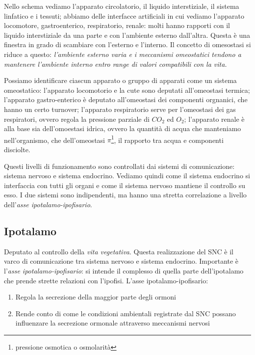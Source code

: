 \documentclass[a4paper,12pt]{article}
\begin{document}
Nello schema vediamo l'apparato circolatorio, il liquido interstiziale, il sistema linfatico e i tessuti; abbiamo delle interfacce artificiali in cui vediamo l'apparato locomotore, gastroenterico, respiratorio, renale: molti hanno rapporti con il liquido interstiziale da una parte e con l'ambiente esterno dall'altra. Questa è una finestra in grado di scambiare con l'esterno e l'interno. Il concetto di omesostasi si riduce a questo: \emph{l'ambiente esterno varia e i meccanismi omeostatici tendono a mantenere l'ambiente interno entro range di valori compatibili con la vita.}

Possiamo identificare ciascun apparato o gruppo di apparati come un sistema omeostatico: l'apparato locomotorio e la cute sono deputati all'omeostasi termica; l'apparato gastro-enterico è deputato all'omeostasi dei componenti orgnanici, che hanno un certo turnover; l'apparato respiratorio serve per l'omeostasi dei gas respiratori, ovvero regola la pressione parziale di $CO_{2}$ ed $O_{2}$; l'apparato renale è alla base sia dell'omoestasi idrica, ovvero la quantità di acqua che manteniamo nell'organismo, che dell'omeostasi $\pi$\footnote{pressione osmotica o osmolarità}, il rapporto tra acqua e componenti disciolte. 

Questi livelli di funzionamento sono controllati dai sistemi di comunicazione: sistema nervoso e sistema endocrino. Vediamo quindi come il sistema endocrino si interfaccia con tutti gli organi e come il sistema nervoso mantiene il controllo su esso. I due sistemi sono indipendenti, ma hanno una stretta correlazione a livello dell'\emph{asse ipotalamo-ipofisario}.

\subsection{Ipotalamo}
Deputato al controllo della \emph{vita vegetativa}. Questa realizzazione del SNC è il varco di comunicazione tra sistema nervoso e sistema endocrino. Importante è l'\emph{asse ipotalamo-ipofisario}: si intende il complesso di quella parte dell'ipotalamo che prende strette relazioni con l'ipofisi. L'asse ipotalamo-ipofisario:
\begin{enumerate}
\item{Regola la secrezione della maggior parte degli ormoni}
\item{Rende conto di come le condizioni ambientali registrate dal SNC possano influenzare la secrezione ormonale attraverso meccanismi nervosi}
\end{enumerate}
\end{document}
